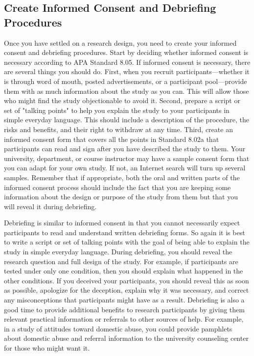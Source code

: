 \subsection{Create Informed Consent and Debriefing Procedures}
Once you have settled on a research design, you need to create your informed consent and debriefing procedures. Start by deciding whether informed consent is necessary according to APA Standard 8.05. If informed consent is necessary, there are several things you should do. First, when you recruit participants---whether it is through word of mouth, posted advertisements, or a participant pool---provide them with as much information about the study as you can. This will allow those who might find the study objectionable to avoid it. Second, prepare a script or set of "talking points" to help you explain the study to your participants in simple everyday language. This should include a description of the procedure, the risks and benefits, and their right to withdraw at any time. Third, create an informed consent form that covers all the points in Standard 8.02a that participants can read and sign after you have described the study to them. Your university, department, or course instructor may have a sample consent form that you can adapt for your own study. If not, an Internet search will turn up several samples. Remember that if appropriate, both the oral and written parts of the informed consent process should include the fact that you are keeping some information about the design or purpose of the study from them but that you will reveal it during debriefing.

Debriefing is similar to informed consent in that you cannot necessarily expect participants to read and understand written debriefing forms. So again it is best to write a script or set of talking points with the goal of being able to explain the study in simple everyday language. During debriefing, you should reveal the research question and full design of the study. For example, if participants are tested under only one condition, then you should explain what happened in the other conditions. If you deceived your participants, you should reveal this as soon as possible, apologize for the deception, explain why it was necessary, and correct any misconceptions that participants might have as a result. Debriefing is also a good time to provide additional benefits to research participants by giving them relevant practical information or referrals to other sources of help. For example, in a study of attitudes toward domestic abuse, you could provide pamphlets about domestic abuse and referral information to the university counseling center for those who might want it.

